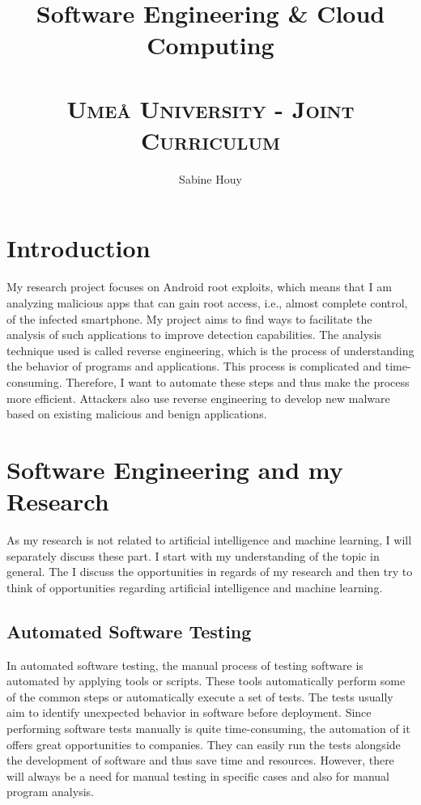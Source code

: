 \documentclass[11pt,a4paper]{article}
\title{%
  Software Engineering \& Cloud Computing \\~\\
  \small\textsc{Umeå University - Joint Curriculum}}
\author{Sabine Houy}
\date{}
\begin{document}
\maketitle

\section{Introduction}
My research project focuses on Android root exploits, which means that I am analyzing malicious apps that can gain root access, i.e., almost complete control, of the infected smartphone. My project aims to find ways to facilitate the analysis of such applications to improve detection capabilities. The analysis technique used is called reverse engineering, which is the process of understanding the behavior of programs and applications. This process is complicated and time-consuming. Therefore, I want to automate these steps and thus make the process more efficient. Attackers also use reverse engineering to develop new malware based on existing malicious and benign applications.

\section{Software Engineering and my Research}
As my research is not related to artificial intelligence and machine learning, I will separately discuss these part. I start with my understanding of the topic in general. The I discuss the opportunities in regards of my research and then try to think of opportunities regarding artificial intelligence and machine learning.

\subsection{Automated Software Testing\label{sec:testing}}
In automated software testing, the manual process of testing software is automated by applying tools or scripts. These tools automatically perform some of the common steps or automatically execute a set of tests. The tests usually aim to identify unexpected behavior in software before deployment. Since performing software tests manually is quite time-consuming, the automation of it offers great opportunities to companies. They can easily run the tests alongside the development of software and thus save time and resources. However, there will always be a need for manual testing in specific cases and also for manual program analysis.\\
\end{document}
